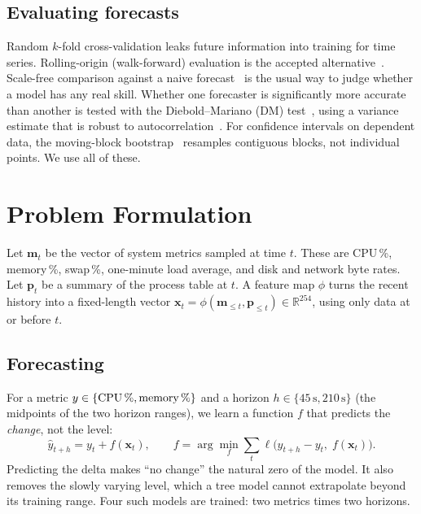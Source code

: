 \documentclass[conference]{IEEEtran}
\begin{document}
\subsection{Evaluating forecasts}
Random $k$-fold cross-validation leaks future information into training for
time series. Rolling-origin (walk-forward) evaluation is the accepted
alternative~\cite{tashman2000,bergmeir2012}. Scale-free comparison against a
naive forecast~\cite{hyndman2006accuracy,hyndman2021fpp} is the usual way to
judge whether a model has any real skill. Whether one forecaster is
significantly more accurate than another is tested with the Diebold--Mariano
(DM) test~\cite{diebold1995dm}, using a variance estimate that is robust to
autocorrelation~\cite{newey1987hac}. For confidence intervals on dependent
data, the moving-block bootstrap~\cite{kunsch1989block} resamples contiguous
blocks, not individual points. We use all of these.

\section{Problem Formulation}\label{sec:problem}
Let $\mathbf{m}_t$ be the vector of system metrics sampled at time $t$. These
are CPU\,\%, memory\,\%, swap\,\%, one-minute load average, and disk and
network byte rates. Let $\mathbf{p}_t$ be a summary of the process table at
$t$. A feature map $\phi$ turns the recent history into a fixed-length vector
$\mathbf{x}_t=\phi(\mathbf{m}_{\le t},\mathbf{p}_{\le t})\in\mathbb{R}^{254}$,
using only data at or before $t$.

\subsection{Forecasting}
For a metric $y\in\{\text{CPU\,\%},\text{memory\,\%}\}$ and a horizon
$h\in\{45\,\text{s},210\,\text{s}\}$ (the midpoints of the two horizon
ranges), we learn a function $f$ that predicts the \emph{change}, not the
level:
\begin{equation}
  \hat y_{t+h} = y_t + f(\mathbf{x}_t), \qquad
  f = \arg\min_{f} \sum_t \ell\big(y_{t+h}-y_t,\; f(\mathbf{x}_t)\big).
\end{equation}
Predicting the delta makes ``no change'' the natural zero of the model. It
also removes the slowly varying level, which a tree model cannot extrapolate
beyond its training range. Four such models are trained: two metrics times
two horizons.
\end{document}
